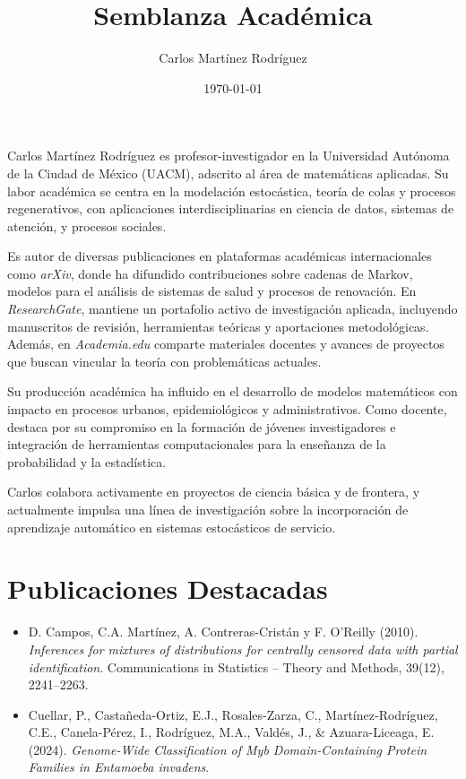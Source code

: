 \documentclass[12pt]{article}
\title{Semblanza Académica}
\author{Carlos Martínez Rodríguez}
\date{\today}
\begin{document}
\maketitle

Carlos Martínez Rodríguez es profesor-investigador en la Universidad Autónoma de la Ciudad de México (UACM), adscrito al área de matemáticas aplicadas. Su labor académica se centra en la modelación estocástica, teoría de colas y procesos regenerativos, con aplicaciones interdisciplinarias en ciencia de datos, sistemas de atención, y procesos sociales.

Es autor de diversas publicaciones en plataformas académicas internacionales como \textit{arXiv}, donde ha difundido contribuciones sobre cadenas de Markov, modelos para el análisis de sistemas de salud y procesos de renovación. En \textit{ResearchGate}, mantiene un portafolio activo de investigación aplicada, incluyendo manuscritos de revisión, herramientas teóricas y aportaciones metodológicas. Además, en \textit{Academia.edu} comparte materiales docentes y avances de proyectos que buscan vincular la teoría con problemáticas actuales.

Su producción académica ha influido en el desarrollo de modelos matemáticos con impacto en procesos urbanos, epidemiológicos y administrativos. Como docente, destaca por su compromiso en la formación de jóvenes investigadores e integración de herramientas computacionales para la enseñanza de la probabilidad y la estadística.

Carlos colabora activamente en proyectos de ciencia básica y de frontera, y actualmente impulsa una línea de investigación sobre la incorporación de aprendizaje automático en sistemas estocásticos de servicio.

\section*{Publicaciones Destacadas}
\begin{itemize}
  \item D. Campos, C.A. Martínez, A. Contreras-Cristán y F. O'Reilly (2010). \textit{Inferences for mixtures of distributions for centrally censored data with partial identification}. Communications in Statistics -- Theory and Methods, 39(12), 2241--2263.
  \item Cuellar, P., Castañeda-Ortiz, E.J., Rosales-Zarza, C., Martínez-Rodríguez, C.E., Canela-Pérez, I., Rodríguez, M.A., Valdés, J., \& Azuara-Liceaga, E. (2024). \textit{Genome-Wide Classification of Myb Domain-Containing Protein Families in Entamoeba invadens}.
\end{itemize}
\end{document}
